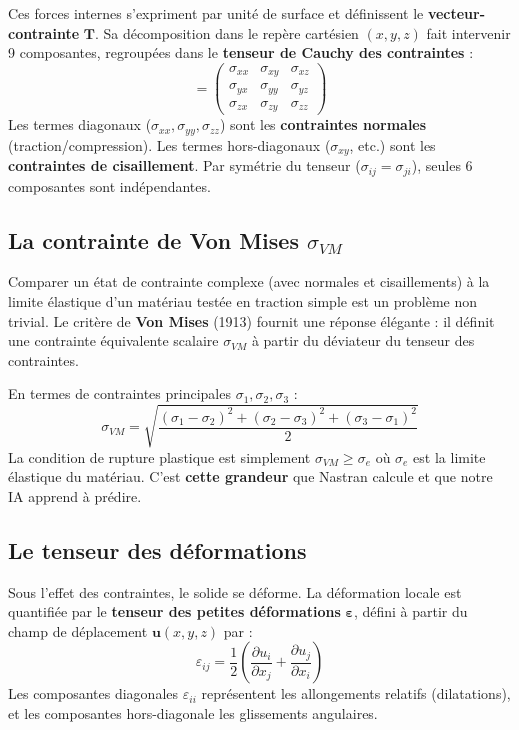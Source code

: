 \documentclass[journal, a4paper, twocolumn]{IEEEtran}
\begin{document}
Ces forces internes s'expriment par unité de surface et définissent le \textbf{vecteur-contrainte} $\bm{T}$. Sa décomposition dans le repère cartésien $(x, y, z)$ fait intervenir 9 composantes, regroupées dans le \textbf{tenseur de Cauchy des contraintes} :
\begin{equation}
    [\bm{\sigma}] = \begin{pmatrix}
    \sigma_{xx} & \sigma_{xy} & \sigma_{xz} \\
    \sigma_{yx} & \sigma_{yy} & \sigma_{yz} \\
    \sigma_{zx} & \sigma_{zy} & \sigma_{zz}
    \end{pmatrix}
\end{equation}
Les termes diagonaux ($\sigma_{xx}, \sigma_{yy}, \sigma_{zz}$) sont les \textbf{contraintes normales} (traction/compression). Les termes hors-diagonaux ($\sigma_{xy}$, etc.) sont les \textbf{contraintes de cisaillement}. Par symétrie du tenseur ($\sigma_{ij} = \sigma_{ji}$), seules 6 composantes sont indépendantes.

\subsection{La contrainte de Von Mises $\sigma_{VM}$}

Comparer un état de contrainte complexe (avec normales et cisaillements) à la limite élastique d'un matériau testée en traction simple est un problème non trivial. Le critère de \textbf{Von Mises} (1913) fournit une réponse élégante : il définit une contrainte équivalente scalaire $\sigma_{VM}$ à partir du déviateur du tenseur des contraintes.

En termes de contraintes principales $\sigma_1, \sigma_2, \sigma_3$ :
\begin{equation}
    \sigma_{VM} = \sqrt{\frac{(\sigma_1-\sigma_2)^2 + (\sigma_2-\sigma_3)^2 + (\sigma_3-\sigma_1)^2}{2}}
\end{equation}
La condition de rupture plastique est simplement $\sigma_{VM} \geq \sigma_e$ où $\sigma_e$ est la limite élastique du matériau. C'est \textbf{cette grandeur} que Nastran calcule et que notre IA apprend à prédire.

\subsection{Le tenseur des déformations}

Sous l'effet des contraintes, le solide se déforme. La déformation locale est quantifiée par le \textbf{tenseur des petites déformations} $\bm{\varepsilon}$, défini à partir du champ de déplacement $\bm{u}(x,y,z)$ par :
\begin{equation}
    \varepsilon_{ij} = \frac{1}{2}\left(\frac{\partial u_i}{\partial x_j} + \frac{\partial u_j}{\partial x_i}\right)
\end{equation}
Les composantes diagonales $\varepsilon_{ii}$ représentent les allongements relatifs (dilatations), et les composantes hors-diagonale les glissements angulaires.
\end{document}
